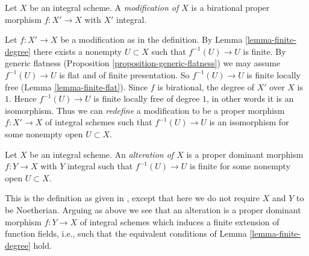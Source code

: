 \begin{definition}
\label{definition-modification}
Let $X$ be an integral scheme. A {\it modification of $X$}
is a birational proper morphism $f : X' \to X$ with $X'$
integral.
\end{definition}

\noindent
Let $f : X' \to X$ be a modification as in the definition. By
Lemma \ref{lemma-finite-degree} there exists a nonempty $U \subset X$ such
that $f^{-1}(U) \to U$ is finite. By generic flatness
(Proposition \ref{proposition-generic-flatness})
we may assume $f^{-1}(U) \to U$ is flat and of finite presentation.
So $f^{-1}(U) \to U$ is finite locally free (Lemma \ref{lemma-finite-flat}).
Since $f$ is birational, the degree of $X'$ over $X$ is $1$.
Hence $f^{-1}(U) \to U$ is finite locally free of degree $1$,
in other words it is an isomorphism. Thus we can {\it redefine} a
modification to be a proper morphism $f : X' \to X$ of integral schemes
such that $f^{-1}(U) \to U$ is an isomorphism for some nonempty open
$U \subset X$.

\begin{definition}
\label{definition-alteration}
\begin{reference}
\cite[Definition 2.20]{alterations}
\end{reference}
Let $X$ be an integral scheme. An {\it alteration of $X$}
is a proper dominant morphism $f : Y \to X$ with $Y$ integral such
that $f^{-1}(U) \to U$ is finite for some nonempty open $U \subset X$.
\end{definition}

\noindent
This is the definition as given in \cite{alterations}, except that
here we do not require $X$ and $Y$ to be Noetherian. Arguing as above
we see that an alteration is a proper dominant morphism $f : Y \to X$
of integral schemes which induces a finite extension of
function fields, i.e., such that the equivalent conditions of
Lemma \ref{lemma-finite-degree} hold.



